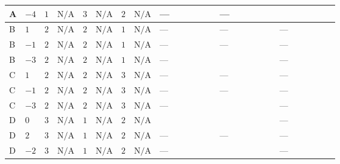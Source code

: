 \documentclass[8pt]{article}
\begin{document}
\begin{landscape}
\begin{longtable}{@{}llcccccc >{\raggedright\arraybackslash}p{0.21\linewidth} >{\raggedright\arraybackslash}p{0.21\linewidth} >{\raggedright\arraybackslash}p{0.21\linewidth}@{}}
\midrule
A & $-4$ & $1$ & $\text{N/A}$ & $3$ & $\text{N/A}$ & $2$ & $\text{N/A}$ & --- & --- & \scriptsize\adjustbox{max width=\linewidth}{$\begin{gathered} +6 {g_2}^4\end{gathered}$} \\
\midrule
B & $1$ & $2$ & $\text{N/A}$ & $2$ & $\text{N/A}$ & $1$ & $\text{N/A}$ & --- & --- & --- \\
\midrule
B & $-1$ & $2$ & $\text{N/A}$ & $2$ & $\text{N/A}$ & $1$ & $\text{N/A}$ & --- & --- & --- \\
\midrule
B & $-3$ & $2$ & $\text{N/A}$ & $2$ & $\text{N/A}$ & $1$ & $\text{N/A}$ & --- & \scriptsize\adjustbox{max width=\linewidth}{$\begin{gathered} +24 {\lambda_{X_{10}}} \left({\lambda_{X_{10}}}\right)^{*}\end{gathered}$} & --- \\
\midrule
C & $1$ & $2$ & $\text{N/A}$ & $2$ & $\text{N/A}$ & $3$ & $\text{N/A}$ & --- & --- & --- \\
\midrule
C & $-1$ & $2$ & $\text{N/A}$ & $2$ & $\text{N/A}$ & $3$ & $\text{N/A}$ & --- & --- & --- \\
\midrule
C & $-3$ & $2$ & $\text{N/A}$ & $2$ & $\text{N/A}$ & $3$ & $\text{N/A}$ & --- & \scriptsize\adjustbox{max width=\linewidth}{$\begin{gathered} +24 {\lambda_{X_{10}}} \left({\lambda_{X_{10}}}\right)^{*}\end{gathered}$} & --- \\
\midrule
D & $0$ & $3$ & $\text{N/A}$ & $1$ & $\text{N/A}$ & $2$ & $\text{N/A}$ & \scriptsize\adjustbox{max width=\linewidth}{$\begin{gathered} +12 {\lambda_{X_{5}}^{(1)}} \left({\lambda_{X_{18}}}\right)^{*}\end{gathered}$} & \scriptsize\adjustbox{max width=\linewidth}{$\begin{gathered} +12 {\lambda_{X_{14}}} \left({\lambda_{X_{14}}}\right)^{*}\end{gathered}$} & --- \\
\midrule
D & $2$ & $3$ & $\text{N/A}$ & $1$ & $\text{N/A}$ & $2$ & $\text{N/A}$ & --- & --- & --- \\
\midrule
D & $-2$ & $3$ & $\text{N/A}$ & $1$ & $\text{N/A}$ & $2$ & $\text{N/A}$ & --- & \scriptsize\adjustbox{max width=\linewidth}{$\begin{gathered} +12 {\lambda_{X_{12}}} \left({\lambda_{X_{12}}}\right)^{*}\end{gathered}$} & --- \\

\end{longtable}
\end{landscape}
\end{document}
